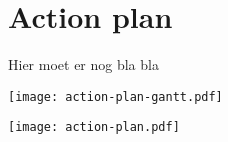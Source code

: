 
\chapter{Action plan}
\label{chp:action_plan}

Hier moet er nog bla bla

\texttt{[image: action-plan-gantt.pdf]}

\newpage

\texttt{[image: action-plan.pdf]}
